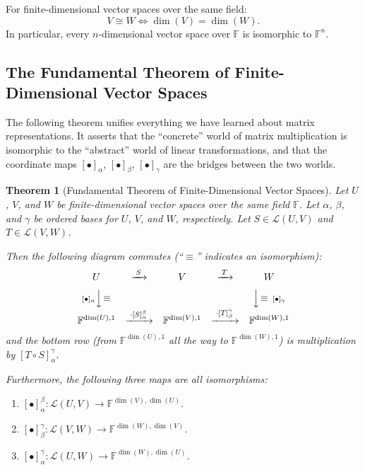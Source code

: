 \documentclass[11pt, a4paper, notitlepage]{report}
\newtheorem{theorem}{Theorem}[section]
\theoremstyle{definition}
\theoremstyle{remark}
\begin{document}
\begin{keyresult}[title={Key Result: Isomorphism and Dimension}]
For finite-dimensional vector spaces over the same field:
\[
  V \cong W \iff \dim(V) = \dim(W).
\]
In particular, every $n$-dimensional vector space over $\mathbb{F}$ is isomorphic to
$\mathbb{F}^n$.
\end{keyresult}

\subsection{The Fundamental Theorem of Finite-Dimensional Vector Spaces}

The following theorem unifies everything we have learned about matrix representations.
It asserts that the ``concrete'' world of matrix multiplication is isomorphic to the
``abstract'' world of linear transformations, and that the coordinate maps
$[\bullet]_\alpha$, $[\bullet]_\beta$, $[\bullet]_\gamma$ are the bridges between
the two worlds.

\begin{theorem}[Fundamental Theorem of Finite-Dimensional Vector Spaces]
\label{thm:fund-thm-fd}
Let $U$, $V$, and $W$ be finite-dimensional vector spaces over the same field
$\mathbb{F}$.  Let $\alpha$, $\beta$, and $\gamma$ be ordered bases for $U$, $V$,
and $W$, respectively.  Let $S \in \mathcal{L}(U,V)$ and $T \in \mathcal{L}(V,W)$.

Then the following diagram commutes (``$\equiv$'' indicates an isomorphism):
\[
\begin{array}{ccccc}
  U & \xrightarrow{\;S\;} & V & \xrightarrow{\;T\;} & W \\[6pt]
  {\scriptstyle [\bullet]_\alpha}\Big\downarrow\!\equiv &&&& \Big\downarrow\!\equiv\,{\scriptstyle [\bullet]_\gamma} \\[4pt]
  \mathbb{F}^{\dim(U),1}
    & \xrightarrow{\;\cdot[S]_\alpha^\beta\;}
    & \mathbb{F}^{\dim(V),1}
    & \xrightarrow{\;\cdot[T]_\beta^\gamma\;}
    & \mathbb{F}^{\dim(W),1}
\end{array}
\]
and the bottom row (from $\mathbb{F}^{\dim(U),1}$ all the way to $\mathbb{F}^{\dim(W),1}$)
is multiplication by $[T \circ S]_\alpha^\gamma$.

Furthermore, the following three maps are all isomorphisms:
\begin{enumerate}
  \item $[\bullet]_\alpha^\beta \colon \mathcal{L}(U,V) \to \mathbb{F}^{\dim(V),\dim(U)}$.
  \item $[\bullet]_\beta^\gamma \colon \mathcal{L}(V,W) \to \mathbb{F}^{\dim(W),\dim(V)}$.
  \item $[\bullet]_\alpha^\gamma \colon \mathcal{L}(U,W) \to \mathbb{F}^{\dim(W),\dim(U)}$.
\end{enumerate}
\end{theorem}
\end{document}
